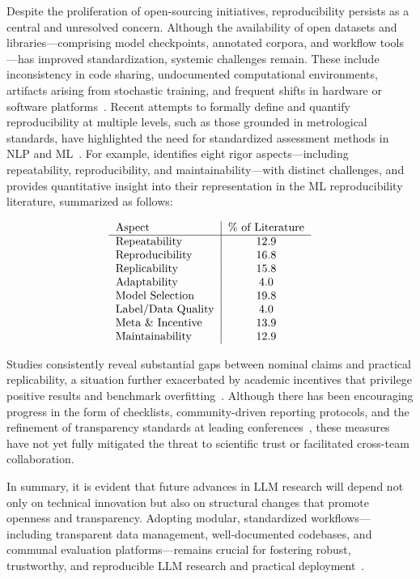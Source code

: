 \documentclass[sigconf]{acmart}
\begin{document}
Despite the proliferation of open-sourcing initiatives, reproducibility persists as a central and unresolved concern. Although the availability of open datasets and libraries—comprising model checkpoints, annotated corpora, and workflow tools—has improved standardization, systemic challenges remain. These include inconsistency in code sharing, undocumented computational environments, artifacts arising from stochastic training, and frequent shifts in hardware or software platforms~\cite{ref74,ref75,ref80,ref81,ref83,ref85,ref86,ref87,ref91}. Recent attempts to formally define and quantify reproducibility at multiple levels, such as those grounded in metrological standards, have highlighted the need for standardized assessment methods in NLP and ML~\cite{ref13,ref66,ref67}. For example, \cite{ref67} identifies eight rigor aspects—including repeatability, reproducibility, and maintainability—with distinct challenges, and provides quantitative insight into their representation in the ML reproducibility literature, summarized as follows:

\[
\begin{tabular}{l|c}
Aspect & \% of Literature \\
\hline
Repeatability & 12.9 \\
Reproducibility & 16.8 \\
Replicability & 15.8 \\
Adaptability & 4.0 \\
Model Selection & 19.8 \\
Label/Data Quality & 4.0 \\
Meta \& Incentive & 13.9 \\
Maintainability & 12.9 \\
\end{tabular}
\]

Studies consistently reveal substantial gaps between nominal claims and practical replicability, a situation further exacerbated by academic incentives that privilege positive results and benchmark overfitting~\cite{ref61,ref79,ref82,ref85,ref87,ref91}. Although there has been encouraging progress in the form of checklists, community-driven reporting protocols, and the refinement of transparency standards at leading conferences~\cite{ref33,ref81,ref83,ref84}, these measures have not yet fully mitigated the threat to scientific trust or facilitated cross-team collaboration.

In summary, it is evident that future advances in LLM research will depend not only on technical innovation but also on structural changes that promote openness and transparency. Adopting modular, standardized workflows—including transparent data management, well-documented codebases, and communal evaluation platforms—remains crucial for fostering robust, trustworthy, and reproducible LLM research and practical deployment~\cite{ref81,ref82,ref83,ref86,ref91}.
\end{document}
